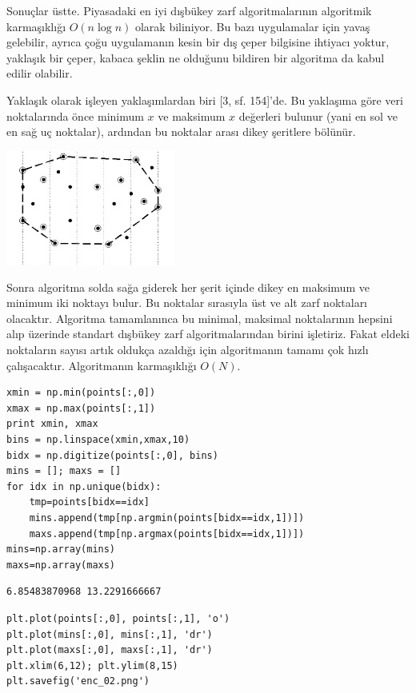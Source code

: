 \documentclass[12pt,fleqn]{article}\usepackage{../../common}
\begin{document}
Sonuçlar üstte. Piyasadaki en iyi dışbükey zarf algoritmalarının algoritmik
karmaşıklığı $O(n \log n)$ olarak biliniyor. Bu bazı uygulamalar için yavaş
gelebilir, ayrıca çoğu uygulamanın kesin bir dış çeper bilgisine
ihtiyacı yoktur, yaklaşık bir çeper, kabaca şeklin ne olduğunu bildiren bir
algoritma da kabul edilir olabilir.

Yaklaşık olarak işleyen yaklaşımlardan biri [3, sf. 154]'de. Bu yaklaşıma
göre veri noktalarında önce minimum $x$ ve maksimum $x$ değerleri bulunur
(yani en sol ve en sağ uç noktalar), ardından bu noktalar arası dikey
şeritlere bölünür.

\includegraphics[width=15em]{enc_03.png}

Sonra algoritma solda sağa giderek her şerit içinde dikey en maksimum ve
minimum iki noktayı bulur. Bu noktalar sırasıyla üst ve alt zarf noktaları
olacaktır. Algoritma tamamlanınca bu minimal, maksimal noktalarının hepsini
alıp üzerinde standart dışbükey zarf algoritmalarından birini
işletiriz. Fakat eldeki noktaların sayısı artık oldukça azaldığı için
algoritmanın tamamı çok hızlı çalışacaktır. Algoritmanın karmaşıklığı
$O(N)$.

\begin{verbatim}
xmin = np.min(points[:,0])
xmax = np.max(points[:,1])
print xmin, xmax
bins = np.linspace(xmin,xmax,10)
bidx = np.digitize(points[:,0], bins)
mins = []; maxs = []
for idx in np.unique(bidx):
    tmp=points[bidx==idx]
    mins.append(tmp[np.argmin(points[bidx==idx,1])])
    maxs.append(tmp[np.argmax(points[bidx==idx,1])])
mins=np.array(mins)
maxs=np.array(maxs)
\end{verbatim}

\begin{verbatim}
6.85483870968 13.2291666667
\end{verbatim}

\begin{verbatim}
plt.plot(points[:,0], points[:,1], 'o')
plt.plot(mins[:,0], mins[:,1], 'dr')
plt.plot(maxs[:,0], maxs[:,1], 'dr')
plt.xlim(6,12); plt.ylim(8,15)
plt.savefig('enc_02.png')
\end{verbatim}
\end{document}
